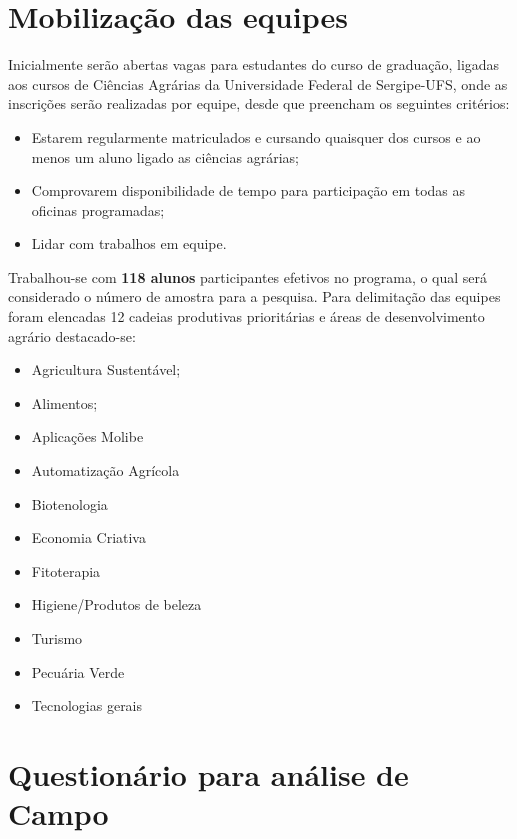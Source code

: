 \section{Mobilização das equipes}

Inicialmente serão abertas vagas para estudantes do curso de graduação, ligadas aos cursos de Ciências Agrárias da Universidade Federal de Sergipe-UFS, onde as inscrições serão realizadas por equipe, desde que preencham os seguintes critérios:

	
\begin{itemize}
\item{Estarem regularmente matriculados e cursando quaisquer dos cursos e ao menos um aluno ligado as ciências agrárias;}
\item{Comprovarem disponibilidade de tempo para participação em todas as oficinas programadas;}
\item{Lidar com trabalhos em equipe.}
\end{itemize}

Trabalhou-se com \textbf{118 alunos} participantes efetivos no programa, o qual será considerado o número de amostra para a pesquisa. Para delimitação das equipes foram elencadas 12 cadeias produtivas  prioritárias e áreas de desenvolvimento agrário destacado-se:

\begin{multicols}{2}
\centering
    \begin{itemize}
    \item{Agricultura Sustentável;}
    \item{Alimentos;}
    \item{Aplicações Molibe}
    \item{Automatização Agrícola}
    \item{Biotenologia}
    \item{Economia Criativa}
    \item{Fitoterapia}
    \item{Higiene/Produtos de beleza}
    \item{Turismo}
    \item{Pecuária Verde}
    \item{Tecnologias gerais}
\end{itemize}
\end{multicols}

\section{Questionário para análise de Campo}

